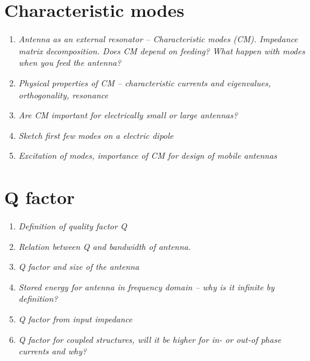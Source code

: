 \documentclass[11pt,a4paper]{article}
\begin{document}
\section{Characteristic modes}
\begin{enumerate}
    \item \emph{Antenna as an external resonator -- Characteristic modes (CM). Impedance matrix decomposition. Does CM depend on feeding? What happen with modes when you feed the antenna?}
    \item \emph{Physical properties of CM -- characteristic currents and eigenvalues, orthogonality, resonance}
    \item \emph{Are CM important for electrically small or large antennas?}
    \item \emph{Sketch first few modes on a electric dipole}
    \item \emph{Excitation of modes, importance of CM for design of mobile antennas}
\end{enumerate}

\section{Q factor}
\begin{enumerate}
    \item \emph{Definition of quality factor Q}
    \item \emph{Relation between Q and bandwidth of antenna.}
    \item \emph{Q factor and size of the antenna}
    \item \emph{Stored energy for antenna in frequency domain -- why is it infinite by definition?}
    \item \emph{Q factor from input impedance}
    \item \emph{Q factor for coupled structures, will it be higher for in- or out-of phase currents and why?}
    
    
    
    
\end{enumerate}
\end{document}
